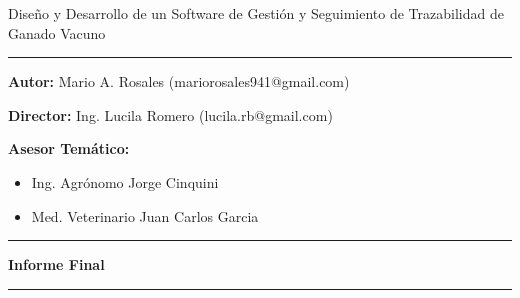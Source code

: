 \documentclass[11pt,oneside]{book}
\begin{document}
\doublespacing
\begin{center}
\LARGE Diseño y Desarrollo de un Software de Gestión y Seguimiento de Trazabilidad de Ganado Vacuno
\end{center}

\vspace{0.25cm}
\begin{center}
\rule{\textwidth}{.4pt}
\end{center}
\vspace{0.25cm}


\textbf{Autor:} Mario A. Rosales (mariorosales941@gmail.com)

\textbf{Director:} Ing. Lucila Romero (lucila.rb@gmail.com)


\textbf{Asesor Temático:}
\begin{itemize}
\item Ing. Agrónomo Jorge Cinquini
\item Med. Veterinario Juan Carlos Garcia
\end{itemize}

\begin{center}
\rule{\textwidth}{.4pt}
\end{center}
\vspace{3.5mm}

\begin{center}
\textbf{\Large Informe Final}
\end{center}

\begin{center}
\rule{\textwidth}{.4pt}
\end{center}

\setlength{\parskip}{5mm}


\clearpage
\newpage
\setlength{\cftbeforetoctitleskip}{0pt}			

\renewcommand{\cfttoctitlefont}{\Large\bfseries}	
\tableofcontents     	%
\newpage
\listoffigures	     	%
\newpage
\listoftables	     	%
\newpage
\lstlistoflistings 	    %
\end{document}
